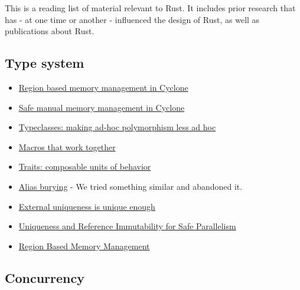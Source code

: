 This is a reading list of material relevant to Rust. It includes prior research that has - at one time or another - 
influenced the design of Rust, as well as publications about Rust.


\subsection*{Type system}

\begin{itemize}
  \item{\href{http://209.68.42.137/ucsd-pages/Courses/cse227.w03/handouts/cyclone-regions.pdf}
          {Region based memory management in Cyclone}}
  \item{\href{http://www.cs.umd.edu/projects/PL/cyclone/scp.pdf}{Safe manual memory management in Cyclone}}
  \item{\href{http://www.ps.uni-sb.de/courses/typen-ws99/class.ps.gz}{Typeclasses: making ad-hoc polymorphism less ad hoc}}
  \item{\href{https://www.cs.utah.edu/plt/publications/jfp12-draft-fcdf.pdf}{Macros that work together}}
  \item{\href{http://scg.unibe.ch/archive/papers/Scha03aTraits.pdf}{Traits: composable units of behavior}}
  \item{\href{http://www.cs.uwm.edu/faculty/boyland/papers/unique-preprint.ps}{Alias burying} - 
          We tried something similar and abandoned it.}
  \item{\href{http://www.cs.uu.nl/research/techreps/UU-CS-2002-048.html}{External uniqueness is unique enough}}
  \item{\href{https://research.microsoft.com/pubs/170528/msr-tr-2012-79.pdf}
          {Uniqueness and Reference Immutability for Safe Parallelism}}
  \item{\href{http://www.cs.ucla.edu/\%7Epalsberg/tba/papers/tofte-talpin-iandc97.pdf}{Region Based Memory Management}}
\end{itemize}


\subsection*{Concurrency}


